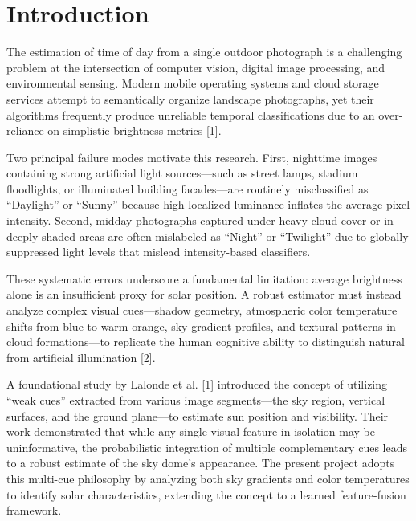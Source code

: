 \documentclass[9pt, a4paper, twocolumn]{article}
\begin{document}
\section{Introduction}

The estimation of time of day from a single outdoor photograph is a challenging problem at the intersection of computer vision, digital image processing, and environmental sensing. Modern mobile operating systems and cloud storage services attempt to semantically organize landscape photographs, yet their algorithms frequently produce unreliable temporal classifications due to an over-reliance on simplistic brightness metrics [1].

Two principal failure modes motivate this research. First, nighttime images containing strong artificial light sources---such as street lamps, stadium floodlights, or illuminated building facades---are routinely misclassified as ``Daylight'' or ``Sunny'' because high localized luminance inflates the average pixel intensity. Second, midday photographs captured under heavy cloud cover or in deeply shaded areas are often mislabeled as ``Night'' or ``Twilight'' due to globally suppressed light levels that mislead intensity-based classifiers.

These systematic errors underscore a fundamental limitation: average brightness alone is an insufficient proxy for solar position. A robust estimator must instead analyze complex visual cues---shadow geometry, atmospheric color temperature shifts from blue to warm orange, sky gradient profiles, and textural patterns in cloud formations---to replicate the human cognitive ability to distinguish natural from artificial illumination [2].

A foundational study by Lalonde et al. [1] introduced the concept of utilizing ``weak cues'' extracted from various image segments---the sky region, vertical surfaces, and the ground plane---to estimate sun position and visibility. Their work demonstrated that while any single visual feature in isolation may be uninformative, the probabilistic integration of multiple complementary cues leads to a robust estimate of the sky dome's appearance. The present project adopts this multi-cue philosophy by analyzing both sky gradients and color temperatures to identify solar characteristics, extending the concept to a learned feature-fusion framework.
\end{document}
